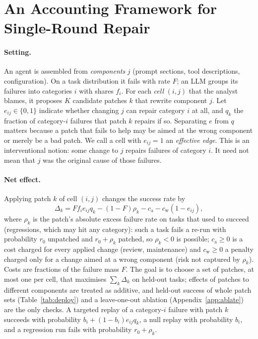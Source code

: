 \documentclass[11pt]{article}
\begin{document}
\section{An Accounting Framework for Single-Round Repair}
\label{app:framework}

\paragraph{Setting.} An agent is assembled from \emph{components} $j$ (prompt sections, tool descriptions, configuration). On a task distribution it fails with rate $F$; an LLM groups its failures into categories $i$ with shares $f_i$. For each \emph{cell} $(i,j)$ that the analyst blames, it proposes $K$ candidate patches $k$ that rewrite component $j$. Let $e_{ij}\in\{0,1\}$ indicate whether changing $j$ can repair category $i$ at all, and $q_k$ the fraction of category-$i$ failures that patch $k$ repairs if so. Separating $e$ from $q$ matters because a patch that fails to help may be aimed at the wrong component or merely be a bad patch. We call a cell with $e_{ij}=1$ an \emph{effective edge}. This is an interventional notion: some change to $j$ repairs failures of category $i$. It need not mean that $j$ was the original cause of those failures.

\paragraph{Net effect.} Applying patch $k$ of cell $(i,j)$ changes the success rate by
\begin{equation}
\Delta_k = F f_i e_{ij} q_k - (1-F)\rho_k - c_{\mathrm{a}} - c_{\mathrm{w}}(1-e_{ij}),
\label{eq:delta}
\end{equation}
where $\rho_k$ is the patch's absolute excess failure rate on tasks that used to succeed (regressions, which may hit any category): such a task fails a re-run with probability $r_0$ unpatched and $r_0+\rho_k$ patched, so $\rho_k<0$ is possible; $c_{\mathrm a}\ge0$ is a cost charged for every applied change (review, maintenance) and $c_{\mathrm w}\ge0$ a penalty charged only for a change aimed at a wrong component (risk not captured by $\rho_k$). Costs are fractions of the failure mass $F$. The goal is to choose a set of patches, at most one per cell, that maximises $\sum_k\Delta_k$ on held-out tasks; effects of patches to different components are treated as additive, and held-out success of whole patch sets (Table~\ref{tab:deploy}) and a leave-one-out ablation (Appendix~\ref{app:ablate}) are the only checks. A targeted replay of a category-$i$ failure with patch $k$ succeeds with probability $b_i+(1-b_i)e_{ij}q_k$, a null replay with probability $b_i$, and a regression run fails with probability $r_0+\rho_k$.
\end{document}
